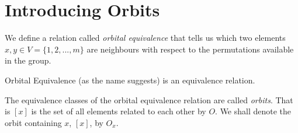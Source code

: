 

\frmrule



\section{Introducing Orbits}

We define a relation called \textit{orbital equivalence} that tells us which two elements 
$x,y \in V = \{1,2,...,m\}$ are neighbours with respect to the permutations available in the group. 


Orbital Equivalence (as the name suggests) is an equivalence relation. 

The equivalence classes of the orbital equivalence relation are called \textit{orbits}.
That is $[x]$ is the set of all elements related to each other by $O$. 
We shall denote the orbit containing $x$, $[x]$, by $O_x$. 

\frmrule


